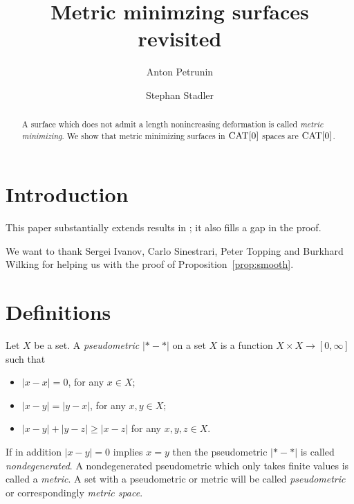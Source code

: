 \documentclass[a4paper,10pt]{amsart}
\begin{document}
\title{Metric minimzing surfaces revisited}
\author{Anton Petrunin}
\address{A. Petrunin\newline\vskip-4mm
Math. Dept. PSU,
University Park, PA 16802,
USA}
\author{Stephan Stadler}
\address{S. Stadler\newline\vskip-4mm
Math. Inst.,
Universit\"at M\"unchen, Theresienstr. 39, D-80333 M\"unchen, Germany}


\date{}

\begin{abstract}
A surface which does not admit a length nonincreasing deformation is called \emph{metric minimizing}.
We show that metric minimizing surfaces in $\mathop{\rm CAT}\nolimits[0]$ spaces are $\mathop{\rm CAT}\nolimits[0]$.
\end{abstract}
\maketitle

\section{Introduction}

This paper substantially extends results in \cite{petrunin-metric-min}; it also fills a gap in the proof. 

\medskip

We want to thank 
Sergei Ivanov,
Carlo Sinestrari,
Peter Topping
and
Burkhard Wilking
for helping us with the proof of Proposition~\ref{prop:smooth}.

\section{Definitions}\label{sec:Def}

Let $X$ be a set.
A \emph{pseudometric} $|{*}-{*}|$ on a set $X$ 
is a function $X\times X\to[0,\infty]$
such that 
\begin{itemize}
\item $|x-x|=0$, for any $x\in X$;
\item $|x-y|=|y-x|$, for any $x,y\in X$;
\item $|x-y|+|y-z|\ge|x-z|$ for any  $x,y,z\in X$.
\end{itemize}
If in addition $|x-y|=0$ implies $x=y$ then the pseudometric $|{*}-{*}|$ is called \emph{nondegenerated}.
A nondegenerated pseudometric which only takes finite values is called a \emph{metric}. A set with a pseudometric 
or metric will be called \emph{pseudometric} or correspondingly \emph{metric space}.
\end{document}
